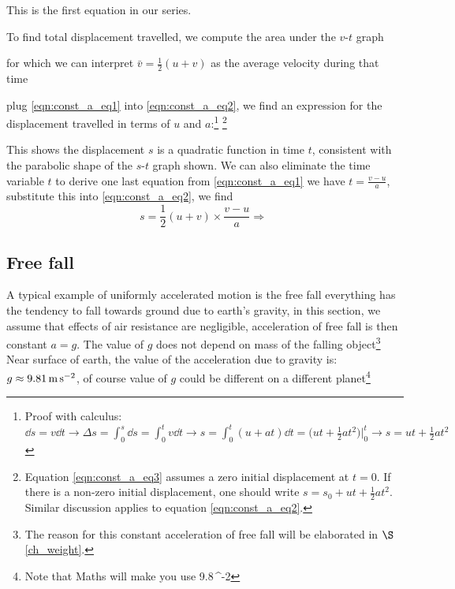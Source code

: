 \documentclass[a4paper,12pt]{book}
\newcounter{example}[chapter]
\newcommand{\mpss}{\,\text{m\,s}^{-2}}
\newcommand{\RA}{\Rightarrow\;}
\newcommand{\ra}{\rightarrow}
\newcommand{\tcbhighmath}[1]{\boxed{#1}}
\begin{document}

This is the first equation in our series. 

To find total displacement travelled, we compute the area under the $v$-$t$ graph
for which we can interpret $\bar{v}=\frac{1}{2}(u+v)$ as the average velocity during that time

plug \eqref{eqn:const_a_eq1} into \eqref{eqn:const_a_eq2}, we find an expression for the displacement travelled in terms of $u$ and $a$:\footnote{Proof with calculus: $\dd s = v \dd t \ra \Delta s = \int_0^s \dd s = \int_0^t v\dd t \ra s = \int_0^t (u+at)\dd t = \big(ut+\frac{1}{2}at^2\big)\bigg|_0^t \ra s = ut + \frac{1}{2}at^2$}
\footnote{Equation \eqref{eqn:const_a_eq3} assumes a zero initial displacement at $t=0$. If there is a non-zero initial displacement, one should write $s = s_0 + ut + \frac{1}{2}at^2$. Similar discussion applies to equation \eqref{eqn:const_a_eq2}.}


This shows the displacement $s$ is a quadratic function in time $t$, consistent with the parabolic shape of the $s$-$t$ graph shown. We can also eliminate the time variable $t$ to derive one last equation from \eqref{eqn:const_a_eq1} we have $t=\frac{v-u}{a}$, substitute this into \eqref{eqn:const_a_eq2}, we find
\begin{equation}\label{eqn:const_a_eq4}
	s=\frac{1}{2}(u+v)\times\frac{v-u}{a} \RA \end{equation}

\subsection{Free fall}\label{ch_freefall}

A typical example of uniformly accelerated motion is the free fall everything has the tendency to fall towards ground due to earth's gravity, in this section, we assume that effects of air resistance are negligible, acceleration of free fall is then constant $a=g$. The value of $g$ does not depend on mass of the falling object\footnote{The reason for this constant acceleration of free fall will be elaborated in $\S$\ref{ch_weight}.} Near surface of earth, the value of the acceleration due to gravity is: $g\approx9.81\mpss$, of course value of $g$ could be different on a different planet\footnote[][]{Note that Maths will make you use 9.8\mpss}
\end{document}
